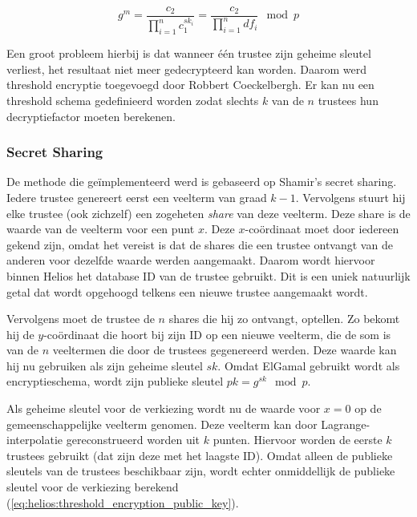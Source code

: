 \begin{equation}
  \label{eq:helios:elgamal_m_homomorphic_trustees}
  g^m = \frac{c_2}{\prod_{i=1}^n{c_1^{{sk}_i}}} = \frac{c_2}{\prod_{i=1}^n{{df}_i}} \mod{p}
\end{equation}

\npar Een groot probleem hierbij is dat wanneer \'e\'en trustee zijn geheime sleutel verliest, het resultaat niet meer gedecrypteerd kan worden. Daarom werd threshold encryptie toegevoegd door Robbert Coeckelbergh.\cite{coeckelbergh_toepassing_en_uitbreiding_van_het_helios_online_verkiezingssysteem} Er kan nu een threshold schema gedefinieerd worden zodat slechts $k$ van de $n$ trustees hun decryptiefactor moeten berekenen.

\subsubsection{Secret Sharing}

De methode die ge\"implementeerd werd is gebaseerd op Shamir's secret sharing.\cite{shamir_how_to_share_a_secret} Iedere trustee genereert eerst een veelterm van graad $k - 1$. Vervolgens stuurt hij elke trustee (ook zichzelf) een zogeheten \textit{share} van deze veelterm. Deze share is de waarde van de veelterm voor een punt $x$. Deze $x$-co\"ordinaat moet door iedereen gekend zijn, omdat het vereist is dat de shares die een trustee ontvangt van de anderen voor dezelfde waarde werden aangemaakt. Daarom wordt hiervoor binnen Helios het database ID van de trustee gebruikt. Dit is een uniek natuurlijk getal dat wordt opgehoogd telkens een nieuwe trustee aangemaakt wordt.

\npar Vervolgens moet de trustee de $n$ shares die hij zo ontvangt, optellen. Zo bekomt hij de $y$-co\"ordinaat die hoort bij zijn ID op een nieuwe veelterm, die de som is van de $n$ veeltermen die door de trustees gegenereerd werden. Deze waarde kan hij nu gebruiken als zijn geheime sleutel ${sk}$. Omdat ElGamal gebruikt wordt als encryptieschema, wordt zijn publieke sleutel ${pk} = g^{sk} \mod{p}$.

\npar Als geheime sleutel voor de verkiezing wordt nu de waarde voor $x = 0$ op de gemeenschappelijke veelterm genomen. Deze veelterm kan door Lagrange-interpolatie gereconstrueerd worden uit $k$ punten. Hiervoor worden de eerste $k$ trustees gebruikt (dat zijn deze met het laagste ID). Omdat alleen de publieke sleutels van de trustees beschikbaar zijn, wordt echter onmiddellijk de publieke sleutel voor de verkiezing berekend (\ref{eq:helios:threshold_encryption_public_key}).

